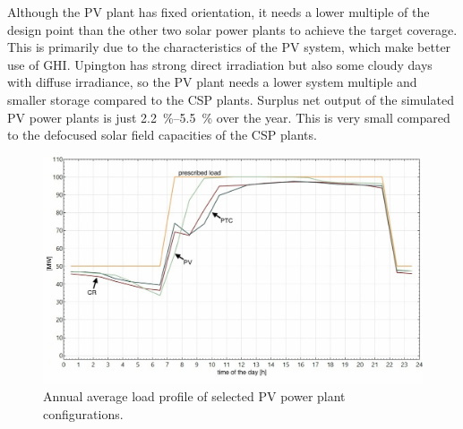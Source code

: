 
Although the \ac{PV} plant has fixed orientation, it needs a lower multiple of the design point than the other two solar power plants to achieve the target coverage. This is primarily due to the characteristics of the \ac{PV} system, which make better use of \ac{GHI}. Upington has strong direct irradiation but also some cloudy days with diffuse irradiance, so the \ac{PV} plant needs a lower system multiple and smaller storage compared to the \ac{CSP} plants. Surplus net output of the simulated \ac{PV} power plants is just \SIrange{2.2}{5.5}{\percent} over the year. This is very small compared to the defocused solar field capacities of the \ac{CSP} plants.


\begin{figure}[htbp]  
\centering
\includegraphics[width=0.9\linewidth]{FIG/90_annual_profil}
\caption{Annual average load profile of selected PV power plant configurations.}\label{90_annual_profil}
\end{figure}

